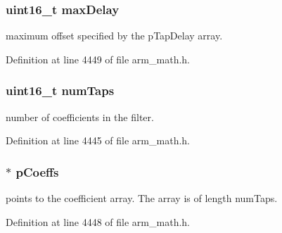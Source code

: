 \subsubsection[{\texorpdfstring{max\+Delay}{maxDelay}}]{\setlength{\rightskip}{0pt plus 5cm}uint16\+\_\+t max\+Delay}\hypertarget{structarm__fir__sparse__instance__q31_ab25f4ee7550e6d92acff77ada283733f}{}\label{structarm__fir__sparse__instance__q31_ab25f4ee7550e6d92acff77ada283733f}
maximum offset specified by the p\+Tap\+Delay array. 

Definition at line 4449 of file arm\+\_\+math.\+h.

\subsubsection[{\texorpdfstring{num\+Taps}{numTaps}}]{\setlength{\rightskip}{0pt plus 5cm}uint16\+\_\+t num\+Taps}\hypertarget{structarm__fir__sparse__instance__q31_a751941891e47f522a7f5375fe8990aac}{}\label{structarm__fir__sparse__instance__q31_a751941891e47f522a7f5375fe8990aac}
number of coefficients in the filter. 

Definition at line 4445 of file arm\+\_\+math.\+h.

\subsubsection[{\texorpdfstring{p\+Coeffs}{pCoeffs}}]{$\ast$ p\+Coeffs}\hypertarget{structarm__fir__sparse__instance__q31_a68888e36167d81cb7836db10367a1682}{}\label{structarm__fir__sparse__instance__q31_a68888e36167d81cb7836db10367a1682}
points to the coefficient array. The array is of length num\+Taps. 

Definition at line 4448 of file arm\+\_\+math.\+h.

